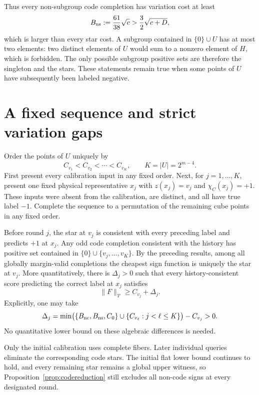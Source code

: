 \documentclass[11pt]{article}
\newcommand{\cV}{\mathcal V}
\begin{document}
Thus every non-subgroup code completion has variation cost at least
\begin{equation}\label{eq:nonsubgroupbarrier}
 B_{\rm ns}:=\frac{61}{38}\sqrt c
    >\frac32\sqrt{c+D},
\end{equation}
which is larger than every star cost. A subgroup contained in
$\{0\}\cup U$ has at most two elements: two distinct elements of $U$
would sum to a nonzero element of $H$, which is forbidden. The only
possible subgroup positive sets are therefore the singleton and the
stars. These statements remain true when some points of $U$ have
subsequently been labeled negative.

\section{A fixed sequence and strict variation gaps}

Order the points of $U$ uniquely by
\[
 C_{v_1}<C_{v_2}<\cdots<C_{v_K},\qquad K=|U|=2^{m-4}.
\]
First present every calibration input in any fixed order. Next, for
$j=1,\ldots,K$, present one fixed physical representative $x_j$ with
$z(x_j)=v_j$ and $\chi_C(x_j)=+1$. These inputs were absent from the
calibration, are distinct, and all have true label $-1$. Complete the
sequence to a permutation of the remaining cube points in any fixed
order.

Before round $j$, the star at $v_j$ is consistent with every preceding
label and predicts $+1$ at $x_j$. Any odd code completion consistent
with the history has positive set contained in
$\{0\}\cup\{v_j,\ldots,v_K\}$. By the preceding results, among all
globally margin-valid completions the cheapest sign function is uniquely
the star at $v_j$. More quantitatively, there is $\Delta_j>0$ such that
every history-consistent score predicting the correct label at $x_j$
satisfies
\begin{equation}\label{eq:variationgap}
 \|F\|_{\cV}\ge C_{v_j}+\Delta_j.
\end{equation}
Explicitly, one may take
\[
 \Delta_j=\min\bigl(\{B_{\rm nc},B_{\rm ns},C_0\}
                  \cup\{C_{v_\ell}:j<\ell\le K\}\bigr)-C_{v_j}>0.
\]
No quantitative lower bound on these algebraic differences is needed.

Only the initial calibration uses complete fibers. Later individual
queries eliminate the corresponding code stars. The initial flat
lower bound continues to hold, and every remaining star remains a
global upper witness, so Proposition~\ref{prop:codereduction} still
excludes all non-code signs at every designated round.
\end{document}
